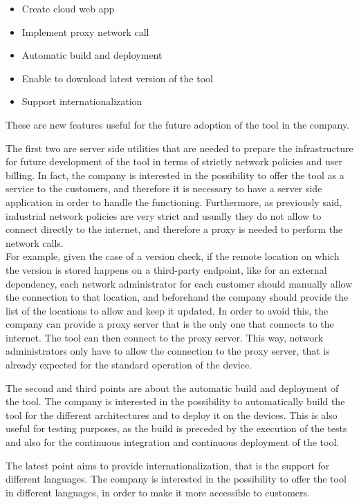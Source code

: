\begin{itemize}
  \item Create cloud web app
  \item Implement proxy network call
  \item Automatic build and deployment
  \item Enable to download latest version of the tool
  \item Support internationalization
\end{itemize}

These are new features useful for the future adoption of the tool in the company.

The first two are server side utilities that are needed to prepare the infrastructure for future development of the tool in terms of strictly network policies and user billing. In fact, the company is interested in the possibility to offer the tool as a service to the customers, and therefore it is necessary to have a server side application in order to handle the functioning. Furthermore, as previously said, industrial network policies are very strict and usually they do not allow to connect directly to the internet, and therefore a proxy is needed to perform the network calls. \\
For example, given the case of a version check, if the remote location on which the version is stored happens on a third-party endpoint, like for an external dependency, each network administrator for each customer should manually allow the connection to that location, and beforehand the company should provide the list of the locations to allow and keep it updated. In order to avoid this, the company can provide a proxy server that is the only one that connects to the internet. The tool can then connect to the proxy server. This way, network administrators only have to allow the connection to the proxy server, that is already expected for the standard operation of the device.

The second and third points are about the automatic build and deployment of the tool. The company is interested in the possibility to automatically build the tool for the different architectures and to deploy it on the devices. This is also useful for testing purposes, as the build is preceded by the execution of the tests and also for the continuous integration and continuous deployment of the tool.

The latest point aims to provide internationalization, that is the support for different languages. The company is interested in the possibility to offer the tool in different languages, in order to make it more accessible to customers.


